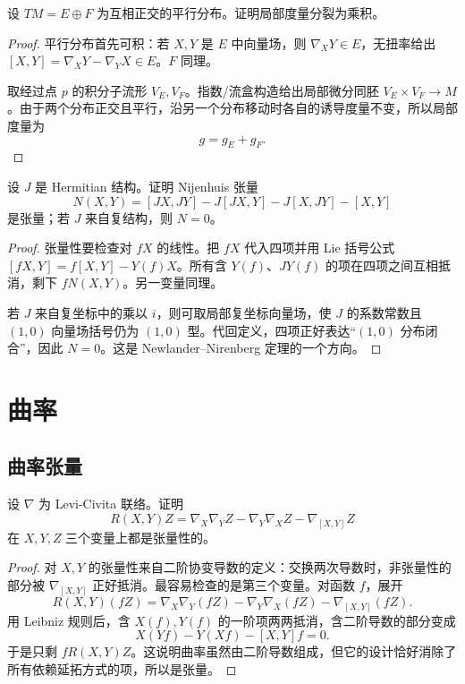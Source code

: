 \documentclass[11pt,a4paper,openany]{ctexbook}
\numberwithin{equation}{chapter}
\begin{document}
\begin{problem}
设 \(TM=E\oplus F\) 为互相正交的平行分布。证明局部度量分裂为乘积。
\end{problem}
\begin{proof}
平行分布首先可积：若 \(X,Y\) 是 \(E\) 中向量场，则 \(\nabla_XY\in E\)，无扭率给出 \([X,Y]=\nabla_XY-\nabla_YX\in E\)。\(F\) 同理。

取经过点 \(p\) 的积分子流形 \(V_E,V_F\)。指数/流盒构造给出局部微分同胚 \(V_E\times V_F\to M\)。由于两个分布正交且平行，沿另一个分布移动时各自的诱导度量不变，所以局部度量为
\[
g=g_E+g_F.
\]
\end{proof}

\begin{problem}
设 \(J\) 是 Hermitian 结构。证明 Nijenhuis 张量
\[
N(X,Y)=[JX,JY]-J[JX,Y]-J[X,JY]-[X,Y]
\]
是张量；若 \(J\) 来自复结构，则 \(N=0\)。
\end{problem}
\begin{proof}
张量性要检查对 \(fX\) 的线性。把 \(fX\) 代入四项并用 Lie 括号公式 \([fX,Y]=f[X,Y]-Y(f)X\)。所有含 \(Y(f)\)、\(JY(f)\) 的项在四项之间互相抵消，剩下 \(fN(X,Y)\)。另一变量同理。

若 \(J\) 来自复坐标中的乘以 \(i\)，则可取局部复坐标向量场，使 \(J\) 的系数常数且 \((1,0)\) 向量场括号仍为 \((1,0)\) 型。代回定义，四项正好表达“\((1,0)\) 分布闭合”，因此 \(N=0\)。这是 Newlander--Nirenberg 定理的一个方向。
\end{proof}

\chapter{曲率}

\section{曲率张量}

\begin{problem}
设 \(\nabla\) 为 Levi-Civita 联络。证明
\[
R(X,Y)Z=\nabla_X\nabla_YZ-\nabla_Y\nabla_XZ-\nabla_{[X,Y]}Z
\]
在 \(X,Y,Z\) 三个变量上都是张量性的。
\end{problem}
\begin{proof}
对 \(X,Y\) 的张量性来自二阶协变导数的定义：交换两次导数时，非张量性的部分被 \(\nabla_{[X,Y]}\) 正好抵消。最容易检查的是第三个变量。对函数 \(f\)，展开
\[
R(X,Y)(fZ)=\nabla_X\nabla_Y(fZ)-\nabla_Y\nabla_X(fZ)-\nabla_{[X,Y]}(fZ).
\]
用 Leibniz 规则后，含 \(X(f),Y(f)\) 的一阶项两两抵消，含二阶导数的部分变成
\[
X(Yf)-Y(Xf)-[X,Y]f=0.
\]
于是只剩 \(fR(X,Y)Z\)。这说明曲率虽然由二阶导数组成，但它的设计恰好消除了所有依赖延拓方式的项，所以是张量。
\end{proof}
\end{document}
